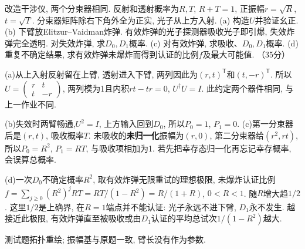 \begin{exercise}
改造干涉仪, 两个分束器相同. 反射和透射概率为$R,T$, $R+T=1$, 正振幅$r=\sqrt R$, $t=\sqrt T$. 分束器矩阵除右下角外全为正实, 光子从上方入射.
(a) 构造$U$并验证幺正.
(b) 下臂放Elitzur--Vaidman炸弹. 有效炸弹的光子探测器吸收光子即引爆, 失效炸弹完全透明. 对失效炸弹, 求$D_0,D_1$概率.
(c) 对有效炸弹, 求吸收、$D_0,D_1$概率.
(d) 重复不确定结果, 求有效炸弹未爆炸而得到认证的比例$f$及最大可能值. （35分）
\end{exercise}
\begin{solution}
(a)从上入射反射留在上臂, 透射进入下臂, 两列因此为$(r,t)^{\mathsf T}$和$(t,-r)^{\mathsf T}$. 所以$U=\begin{pmatrix}r&t\\t&-r\end{pmatrix}$, 两列模为1且内积$rt-tr=0$, $U^\dagger U=I$. 此约定两个器件相同, 与上一作业不同.

(b)失效时两臂畅通,$U^2=I$, 上方输入回到$D_0$, 所以$P_0=1$, $P_1=0$. (c)第一分束器后是$(r,t)$, 吸收概率$T$. 未吸收的\textbf{未归一化}振幅为$(r,0)$, 第二分束器给$(r^2,rt)$, 所以$P_0=R^2$, $P_1=RT$, 与吸收项相加为1. 若先把幸存态归一化再忘记幸存概率, 会误算总概率.

(d)一次$D_0$不确定概率$R^2$, 取有效炸弹无限重试的理想极限, 未爆炸认证比例
$f=\sum_{j\ge0}(R^2)^jRT=RT/(1-R^2)=R/(1+R)$, $0<R<1$. 随$R$增大趋$1/2$. 这里$1/2$是上确界, 在$R=1$端点并不能认证: 光子永远不进下臂, $D_1$永不发生. 越接近此极限, 有效炸弹直至被吸收或由$D_1$认证的平均总试次$1/(1-R^2)$越大.
\end{solution}

\begin{center}
\par 测试题拓扑重绘; 振幅基与原题一致, 臂长没有作为参数.
\end{center}


